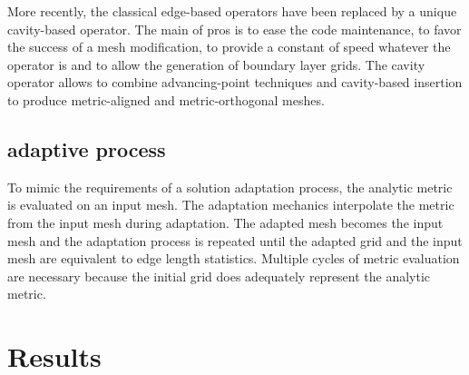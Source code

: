 \documentclass[3p,times,procedia,number]{elsarticle}
\begin{document}
More recently, the classical edge-based operators have been replaced by a unique cavity-based operator.\cite{loseille-menier-imr22-cavity,loseille-menier-alauzet-para-adapt}
The main of pros is to ease the code maintenance,
to favor the success of a mesh modification, to provide a constant of speed whatever the operator is and to allow the generation
of boundary layer grids.\cite{loseille-lohner-imr21-robust-bl-gen}
The cavity operator allows to combine advancing-point techniques
and cavity-based insertion to produce metric-aligned and metric-orthogonal meshes.\cite{loseille-imr-metric-ortho-aniso-gen}

\subsection{adaptive process}

To mimic the requirements of a solution adaptation process,
the analytic metric is evaluated on an input mesh.
The adaptation mechanics interpolate the metric from the input
mesh during adaptation.
The adapted mesh becomes the input mesh and the adaptation process is repeated
until the adapted grid and the input mesh are equivalent to edge
length statistics.
Multiple cycles of metric evaluation are necessary because the
initial grid does adequately represent the analytic metric.

\section{Results}
\label{sec:results}
\end{document}
